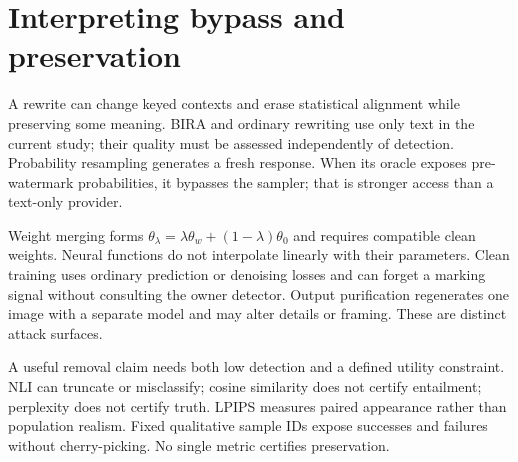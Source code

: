 \section{Interpreting bypass and preservation}
A rewrite can change keyed contexts and erase statistical alignment while preserving some meaning. BIRA and ordinary rewriting use only text in the current study; their quality must be assessed independently of detection. Probability resampling generates a fresh response. When its oracle exposes pre-watermark probabilities, it bypasses the sampler; that is stronger access than a text-only provider.

Weight merging forms $\theta_\lambda=\lambda\theta_w+(1-\lambda)\theta_0$ and requires compatible clean weights. Neural functions do not interpolate linearly with their parameters. Clean training uses ordinary prediction or denoising losses and can forget a marking signal without consulting the owner detector. Output purification regenerates one image with a separate model and may alter details or framing. These are distinct attack surfaces.

A useful removal claim needs both low detection and a defined utility constraint. NLI can truncate or misclassify; cosine similarity does not certify entailment; perplexity does not certify truth. LPIPS measures paired appearance rather than population realism. Fixed qualitative sample IDs expose successes and failures without cherry-picking. No single metric certifies preservation.

